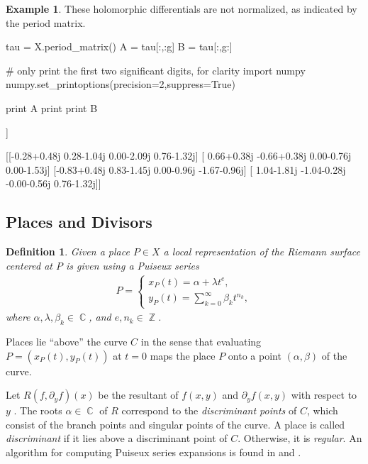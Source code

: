 \documentclass[12pt]{article}
\newtheorem{definition}[theorem]{Definition}
\theoremstyle{definition}
\newtheorem{example}[theorem]{Example}
\DeclareMathOperator{\ZZ}{\mathbb{Z}}
\DeclareMathOperator{\CC}{\mathbb{C}}
\begin{document}
\begin{example}
These holomorphic differentials are not normalized, as indicated by the
period matrix.
\begin{ipythoninput}
tau = X.period_matrix()
A = tau[:,:g]
B = tau[:,g:]

# only print the first two significant digits, for clarity
import numpy
numpy.set_printoptions(precision=2,suppress=True)

print A
print
print B
\end{ipythoninput}
\begin{ipythonoutput}
[[ 0.28+1.04j  0.28-0.48j -1.81+1.04j  0.00-0.j  ]
 [ 0.66-1.15j  0.66+0.38j -0.66-1.15j -0.00+1.53j]
 [-0.83+0.48j -0.83+0.48j  0.83-1.45j  0.00+1.93j]
 [-1.04+0.28j -1.04+1.81j -0.48+0.28j  0.00+0.j  ]]

[[-0.28+0.48j  0.28-1.04j  0.00-2.09j  0.76-1.32j]
 [ 0.66+0.38j -0.66+0.38j  0.00-0.76j  0.00-1.53j]
 [-0.83+0.48j  0.83-1.45j  0.00-0.96j -1.67-0.96j]
 [ 1.04-1.81j -1.04-0.28j -0.00-0.56j  0.76-1.32j]]
\end{ipythonoutput}
\end{example}




\subsection{Places and Divisors}


\begin{definition}\label{def:puiseux}
Given a place $P \in X$ a local representation of the Riemann surface
centered at $P$ is given using a Puiseux series
\begin{align} \label{eqn:puiseux}
  P =
  \begin{cases}
    x_P(t) = \alpha + \lambda t^e, \\
    y_P(t) = \sum_{k=0}^\infty \beta_k t^{n_k},
  \end{cases}
\end{align}
where $\alpha, \lambda, \beta_k \in \CC$, and $e, n_k \in \ZZ$.
\end{definition}
\noindent Places lie ``above'' the curve $C$ in the sense that
evaluating $P = (x_P(t), y_P(t))$ at $t=0$ maps the place $P$ onto a
point $(\alpha,\beta)$ of the curve.

Let $R(f,\partial_y f)(x)$ be the resultant of $f(x,y)$ and $\partial_y
f(x,y)$ with respect to $y$ \cite{Griffiths89}. The roots $\alpha \in
\CC$ of $R$ correspond to the {\it discriminant points} of $C$, which
consist of the branch points and singular points of the curve. A place
is called {\it discriminant} if it lies above a discriminant point of
$C$. Otherwise, it is {\it regular}. An algorithm for computing Puiseux
series expansions is found in \cite{Duval89} and
\cite{PoteauxRybowicz08}.
\end{document}
